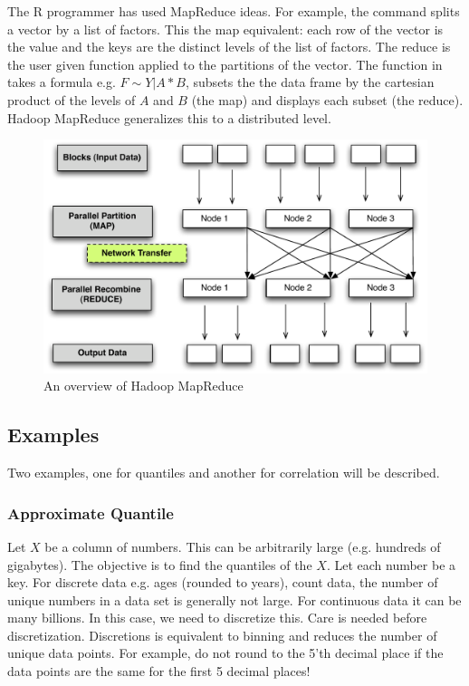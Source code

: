 \documentclass[letterpaper,10pt,english]{sphinxmanual}
\begin{document}
The R programmer has used MapReduce ideas. For example, the  command
splits a vector by a list of factors. This the map equivalent: each row of the
vector is the value and the keys are the distinct levels of the list of
factors. The reduce is the user given function applied to the partitions of the
vector. The  function in  takes a formula e.g. $F\sim
Y|A*B$, subsets the the data frame by the cartesian product of the levels of
$A$ and $B$ (the map) and displays each subset (the reduce). Hadoop
MapReduce generalizes this to a distributed level.
\begin{figure}[htbp]
\centering
\capstart

\includegraphics{mapredslov.pdf}
\caption{An overview of Hadoop MapReduce}\end{figure}


\subsection{Examples}
\label{introduction:examples}
Two examples, one for quantiles and another for correlation will be described.


\subsubsection{Approximate Quantile}
\label{introduction:approximate-quantile}
Let $X$ be a column of numbers. This can be arbitrarily large
(e.g. hundreds of gigabytes). The objective is to find the quantiles of the
$X$. Let each number be a key. For discrete data e.g. ages (rounded to
years), count data, the number of unique numbers in a data set is generally not
large. For continuous data it can be many billions. In this case, we need to
discretize this. Care is needed before discretization. Discretions is equivalent
to binning and reduces the number of unique data points. For example, do not
round to the 5'th decimal place if the data points are the same for the first 5
decimal places!
\end{document}
